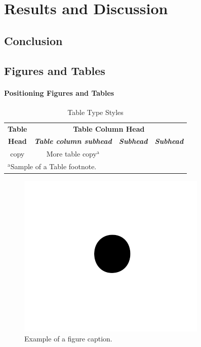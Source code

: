 \documentclass[conference]{IEEEtran}
\begin{document}
\section{Results and Discussion}


\subsection{Conclusion}








\subsection{Figures and Tables}
\paragraph{Positioning Figures and Tables} 

\begin{table}[htbp]
\caption{Table Type Styles}
\begin{center}
\begin{tabular}{|c|c|c|c|}
\hline
\textbf{Table}&\multicolumn{3}{|c|}{\textbf{Table Column Head}} \\
\cline{2-4} 
\textbf{Head} & \textbf{\textit{Table column subhead}}& \textbf{\textit{Subhead}}& \textbf{\textit{Subhead}} \\
\hline
copy& More table copy$^{\mathrm{a}}$& &  \\
\hline
\multicolumn{4}{l}{$^{\mathrm{a}}$Sample of a Table footnote.}
\end{tabular}
\label{tab1}
\end{center}
\end{table}

\begin{figure}[htbp]
\centerline{\includegraphics{fig1.png}}
\caption{Example of a figure caption.}
\label{fig}
\end{figure}
\end{document}
